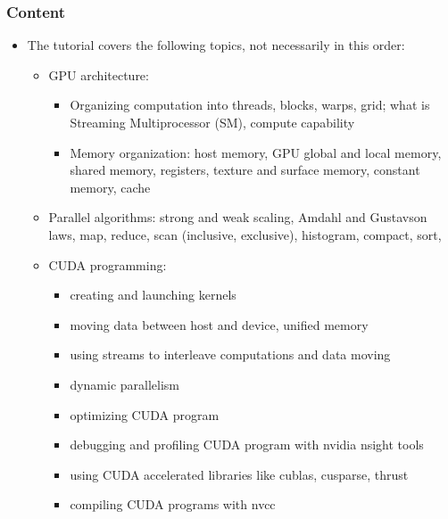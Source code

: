 \begin{frame}[fragile]
  \frametitle{Content}
\begin{itemize}
\item The tutorial covers the following topics, not necessarily in this order:
  \begin{itemize}
    \item GPU architecture:
      \begin{itemize}
      \item Organizing computation into threads, blocks, warps, grid; what is Streaming Multiprocessor (SM), compute capability
      \item Memory organization: host memory, GPU global and local memory, shared memory, registers, texture and surface memory, constant memory, cache
      \end{itemize}
    \item Parallel algorithms: strong and weak scaling, Amdahl and Gustavson laws, map, reduce, scan (inclusive, exclusive), histogram, compact, sort, 
    \item CUDA programming: 
      \begin{itemize}
        \item creating and launching kernels
        \item moving data between host and device, unified memory
        \item using streams to interleave computations and data moving
        \item dynamic parallelism
        \item optimizing CUDA program
        \item debugging and profiling CUDA program with {\color{mycolordef}nvidia nsight tools}
        \item using CUDA accelerated libraries like {\color{mycolorcode}cublas}, {\color{mycolorcode}cusparse}, {\color{mycolorcode}thrust}
        \item compiling CUDA programs with {\color{mycolorcli}nvcc}
      \end{itemize}
  \end{itemize}
\end{itemize}
\end{frame}
